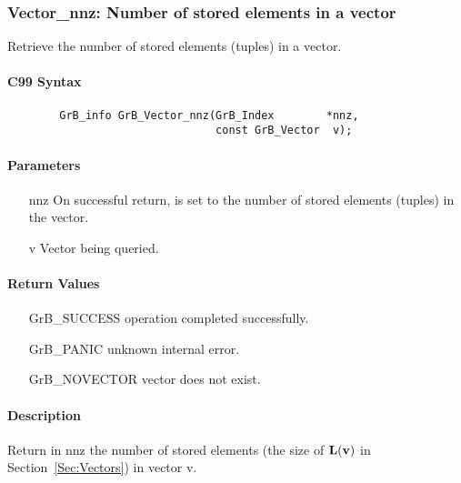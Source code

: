 \subsubsection{{\sf Vector\_nnz}: Number of stored elements in a vector}

Retrieve the number of stored elements (tuples) in a vector.

\paragraph{C99 Syntax}

\begin{verbatim}
        GrB_info GrB_Vector_nnz(GrB_Index        *nnz,
                                const GrB_Vector  v);
\end{verbatim}

\paragraph{Parameters}

\begin{itemize}[leftmargin=1.1in]
    \item[{\sf nnz}] On successful return, is set to the number of stored elements (tuples)
    in the vector.
    \item[{\sf v}] Vector being queried.
\end{itemize}


\paragraph{Return Values}

\begin{itemize}[leftmargin=2.1in]
\item[{\sf GrB\_SUCCESS}]   operation completed successfully.
\item[{\sf GrB\_PANIC}]     unknown internal error.
\item[{\sf GrB\_NOVECTOR}]  vector does not exist.
\end{itemize}

\paragraph{Description}

Return in {\sf nnz} the number of stored elements (the size of $\bold{L}({\bf v})$
in Section~\ref{Sec:Vectors}) in vector {\sf v}.


